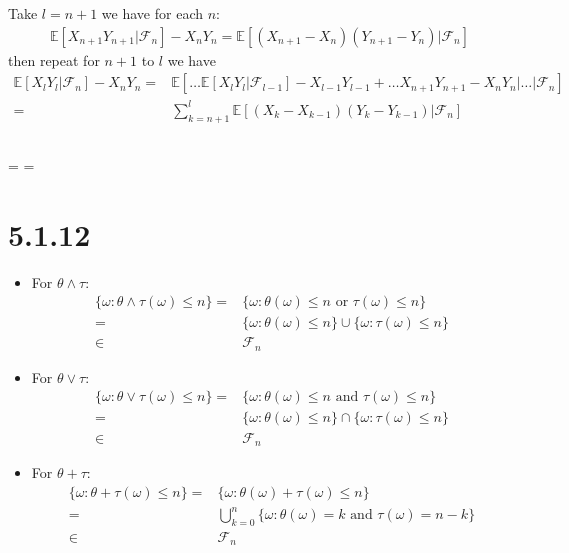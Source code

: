 \documentclass[11pt,a4paper]{ctexart}
\numberwithin{equation}{section}%
\newcommand{\F}{\mathcal{F}}
\begin{document}
Take $ l=n+1 $ we have for each $ n $:
\begin{align*}
    \mathbb{E}\left[ X_{n+1}Y_{n+1}|\F_n \right] - X_nY_n = \mathbb{E}\left[ (X_{n+1}-X_n)(Y_{n+1}-Y_n)|\F_n \right] 
\end{align*}
then repeat for $ n+1 $ to $ l $ we have
\begin{align*}
    \mathbb{E}\left[ X_lY_l|\F_n \right] - X_nY_n  =& \mathbb{E}\left[\ldots \mathbb{E}\left[ X_lY_l|\F_{l-1} \right] -X_{l-1}Y_{l-1} + \ldots X_{n+1}Y_{n+1}-X_{n}Y_{n} | \ldots | \F_n \right] \\
    =& \sum_{k=n+1}^l \mathbb{E}\left[ (X_k-X_{k-1})(Y_{k}-Y_{k-1}) |\F_n \right] 
\end{align*}


\subsection{}


= =

\section{5.1.12}

\begin{itemize}[topsep=2pt,itemsep=0pt]
    \item For $ \theta \wedge \tau $:
    \begin{align*}
        \{\omega : \theta \wedge \tau(\omega )\leq n\} =& \{\omega : \theta(\omega )\leq n \text{ or } \tau(\omega )\leq n\} \\
        =& \{\omega : \theta(\omega )\leq n\} \cup \{\omega : \tau(\omega )\leq n\} \\
        \in & \F_n  
    \end{align*}
    \item For $ \theta \vee \tau $:
    \begin{align*}
        \{\omega : \theta \vee \tau(\omega )\leq n\} =& \{\omega : \theta(\omega )\leq n \text{ and } \tau(\omega )\leq n\} \\
        =& \{\omega : \theta(\omega )\leq n\} \cap \{\omega : \tau(\omega )\leq n\} \\
        \in & \F_n 
    \end{align*}
    \item For $ \theta +\tau $:
    \begin{align*}
        \{\omega : \theta +\tau(\omega )\leq n\} =& \{\omega : \theta(\omega )+ \tau(\omega )\leq n\} \\
        =& \bigcup_{k=0}^n \{\omega : \theta(\omega )=k \text{ and } \tau(\omega )=n-k\} \\
        \in & \F_n
    \end{align*}
\end{itemize}
\end{document}
